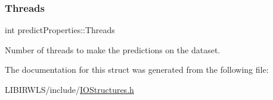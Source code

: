 \subsubsection{\texorpdfstring{Threads}{Threads}}
{\ttfamily int predict\+Properties\+::\+Threads}

Number of threads to make the predictions on the dataset. 

The documentation for this struct was generated from the following file\+:\begin{DoxyCompactItemize}
\item 
L\+I\+B\+I\+R\+W\+L\+S/include/\hyperlink{IOStructures_8h}{I\+O\+Structures.\+h}\end{DoxyCompactItemize}
